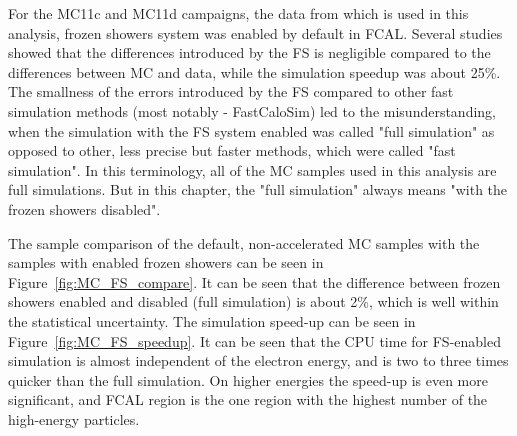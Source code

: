 \begin{figure}
\end{figure}

For the MC11c and MC11d campaigns, the data from which is used in this analysis, frozen showers system was enabled by default in FCAL. Several studies showed that the differences introduced by the FS is negligible compared to the differences between MC and data, while the simulation speedup was about 25\%. The smallness of the errors introduced by the FS compared to other fast simulation methods (most notably - FastCaloSim) led to the misunderstanding, when the simulation with the FS system enabled was called "full simulation" as opposed to other, less precise but faster methods, which were called "fast simulation". In this terminology, all of the MC samples used in this analysis are full simulations. But in this chapter, the "full simulation" always means "with the frozen showers disabled".

The sample comparison of the default, non-accelerated MC samples with the samples with enabled frozen showers can be seen in Figure~\ref{fig:MC_FS_compare}. It can be seen that the difference between frozen showers enabled and disabled (full simulation) is about 2\%, which is well within the statistical uncertainty. The simulation speed-up can be seen in Figure~\ref{fig:MC_FS_speedup}. It can be seen that the CPU time for FS-enabled simulation is almost independent of the electron energy, and is two to three times quicker than the full simulation. On higher energies the speed-up is even more significant, and FCAL region is the one region with the highest number of the high-energy particles.

